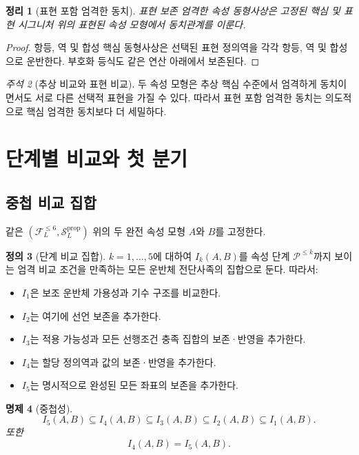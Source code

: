 \documentclass[11pt]{article}
\newcommand{\FVI}{\mathcal F_{L}^{\le 6}}
\newcommand{\Sprop}{\mathcal S_{L}^{\mathrm{prop}}}
\newtheorem{theorem}{정리}[section]
\newtheorem{proposition}[theorem]{명제}
\theoremstyle{definition}
\newtheorem{definition}[theorem]{정의}
\theoremstyle{remark}
\newtheorem{remark}[theorem]{주석}
\begin{document}
\begin{theorem}[표현 포함 엄격한 동치]
표현 보존 엄격한 속성 동형사상은 고정된 핵심 및 표현 시그니처 위의 표현된 속성 모형에서 동치관계를 이룬다.
\end{theorem}

\begin{proof}
항등, 역 및 합성 핵심 동형사상은 선택된 표현 정의역을 각각 항등, 역 및 합성으로 운반한다.
부호화 등식도 같은 연산 아래에서 보존된다.
\end{proof}

\begin{remark}[추상 비교와 표현 비교]
두 속성 모형은 추상 핵심 수준에서 엄격하게 동치이면서도 서로 다른 선택적 표현을 가질 수 있다.
따라서 표현 포함 엄격한 동치는 의도적으로 핵심 엄격한 동치보다 더 세밀하다.
\end{remark}

\section{단계별 비교와 첫 분기}
\label{sec:branching}

\subsection{중첩 비교 집합}

같은 \((\FVI,\Sprop)\) 위의 두 완전 속성 모형 \(A\)와 \(B\)를 고정한다.

\begin{definition}[단계 비교 집합]
\(k=1,\ldots,5\)에 대하여 \(I_k(A,B)\)를 속성 단계 \(\mathcal P^{\le k}\)까지 보이는 엄격 비교 조건을 만족하는 모든 운반체 전단사족의 집합으로 둔다.
따라서:
\begin{itemize}
\item \(I_1\)은 보조 운반체 가용성과 기수 구조를 비교한다.
\item \(I_2\)는 여기에 선언 보존을 추가한다.
\item \(I_3\)는 적용 가능성과 모든 선행조건 충족 집합의 보존·반영을 추가한다.
\item \(I_4\)는 할당 정의역과 값의 보존·반영을 추가한다.
\item \(I_5\)는 명시적으로 완성된 모든 좌표의 보존을 추가한다.
\end{itemize}
\end{definition}

\begin{proposition}[중첩성]
\[
I_5(A,B)\subseteq I_4(A,B)\subseteq I_3(A,B)\subseteq I_2(A,B)\subseteq I_1(A,B).
\]
또한
\[
I_4(A,B)=I_5(A,B).
\]
\end{proposition}
\end{document}
